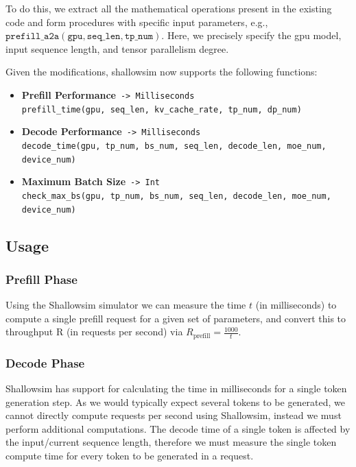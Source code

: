 To do this, we extract all the mathematical operations present in the existing code and form procedures with specific input parameters, e.g., $\texttt{prefill\_a2a}(\texttt{gpu}, \texttt{seq\_len}, \texttt{tp\_num})$.
Here, we precisely specify the gpu model, input sequence length, and tensor parallelism degree.

Given the modifications, shallowsim now supports the following functions:
\begin{itemize}
    \item \textbf{Prefill Performance}\ \texttt{-> Milliseconds}\\
    \texttt{prefill\_time(gpu, seq\_len, kv\_cache\_rate, tp\_num, dp\_num)}
    
    \item \textbf{Decode Performance}\ \texttt{-> Milliseconds}\\
    \texttt{decode\_time(gpu, tp\_num, bs\_num, seq\_len, decode\_len, moe\_num, device\_num)}
    
    \item \textbf{Maximum Batch Size}\  \texttt{-> Int}\\
    \texttt{check\_max\_bs(gpu, tp\_num, bs\_num, seq\_len, decode\_len, moe\_num, device\_num)}
\end{itemize}

\subsection{Usage}
\label{chap:simulator-usage}

\subsubsection{Prefill Phase}
Using the Shallowsim simulator we can measure the time $t$ (in milliseconds) to compute a single prefill request for a given set of parameters, and convert this to throughput R (in requests per second) via
$R_{\text{prefill}} = \frac{1000}{t}$.


\subsubsection{Decode Phase}
Shallowsim has support for calculating the time in milliseconds for a single token generation step.
As we would typically expect several tokens to be generated, we cannot directly compute requests per second using Shallowsim, instead we must perform additional computations.
The decode time of a single token is affected by the input/current sequence length, therefore we must measure the single token compute time for every token to be generated in a request.

